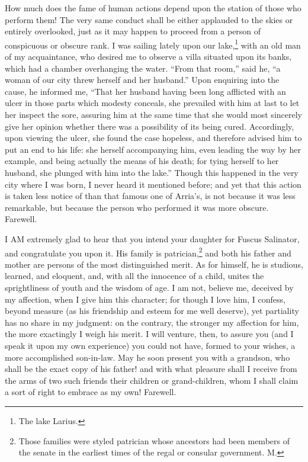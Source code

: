 How much does the fame of human actions depend upon the station of those
who perform them! The very same conduct shall be either applauded to the
skies or entirely overlooked, just as it may happen to proceed from a
person of conspicuous or obscure rank. I was sailing lately upon our lake,\footnote{The lake Larius.}
with an old man of my acquaintance, who desired me to observe a villa
situated upon its banks, which had a chamber overhanging the water. ``From
that room,'' said he, ``a woman of our city threw herself and her husband.''
Upon enquiring into the cause, he informed me, ``That her husband having
been long afflicted with an ulcer in those parts which modesty conceals,
she prevailed with him at last to let her inspect the sore, assuring him
at the same time that she would most sincerely give her opinion whether
there was a possibility of its being cured. Accordingly, upon viewing the
ulcer, she found the case hopeless, and therefore advised him to put an
end to his life: she herself accompanying him, even leading the way by her
example, and being actually the means of his death; for tying herself to
her husband, she plunged with him into the lake.'' Though this happened in
the very city where I was born, I never heard it mentioned before; and yet
that this action is taken less notice of than that famous one of Arria's,
is not because it was less remarkable, but because the person who
performed it was more obscure. Farewell.


I AM extremely glad to hear that you intend your daughter for Fuscus
Salinator, and congratulate you upon it. His family is patrician,\footnote{Those families were
styled patrician whose ancestors had been members of the senate in the
earliest times of the regal or consular government. M.} and
both his father and mother are persons of the most distinguished merit. As
for himself, he is studious, learned, and eloquent, and, with all the
innocence of a child, unites the sprightliness of youth and the wisdom of
age. I am not, believe me, deceived by my affection, when I give him this
character; for though I love him, I confess, beyond measure (as his
friendship and esteem for me well deserve), yet partiality has no share in
my judgment: on the contrary, the stronger my affection for him, the more
exactingly I weigh his merit. I will venture, then, to assure you (and I
speak it upon my own experience) you could not have, formed to your
wishes, a more accomplished son-in-law. May he soon present you with a
grandson, who shall be the exact copy of his father! and with what
pleasure shall I receive from the arms of two such friends their children
or grand-children, whom I shall claim a sort of right to embrace as my
own! Farewell.

